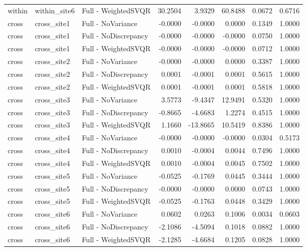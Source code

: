 \begin{table}
\begin{tabular}{lllrrrrr}
within & within\_site6 & Full - WeightedSVQR & 30.2504 & 3.9329 & 60.8488 & 0.0672 & 0.6716 \\
cross & cross\_site1 & Full - NoVariance & -0.0000 & -0.0000 & 0.0000 & 0.1349 & 1.0000 \\
cross & cross\_site1 & Full - NoDiscrepancy & -0.0000 & -0.0000 & -0.0000 & 0.0750 & 1.0000 \\
cross & cross\_site1 & Full - WeightedSVQR & -0.0000 & -0.0000 & -0.0000 & 0.0712 & 1.0000 \\
cross & cross\_site2 & Full - NoVariance & -0.0000 & -0.0000 & 0.0000 & 0.3387 & 1.0000 \\
cross & cross\_site2 & Full - NoDiscrepancy & 0.0001 & -0.0001 & 0.0001 & 0.5615 & 1.0000 \\
cross & cross\_site2 & Full - WeightedSVQR & 0.0001 & -0.0001 & 0.0001 & 0.5818 & 1.0000 \\
cross & cross\_site3 & Full - NoVariance & 3.5773 & -9.4347 & 12.9491 & 0.5320 & 1.0000 \\
cross & cross\_site3 & Full - NoDiscrepancy & -0.8665 & -4.6683 & 1.2274 & 0.4515 & 1.0000 \\
cross & cross\_site3 & Full - WeightedSVQR & 1.1660 & -13.8665 & 10.5419 & 0.8386 & 1.0000 \\
cross & cross\_site4 & Full - NoVariance & -0.0000 & -0.0000 & -0.0000 & 0.0304 & 0.5173 \\
cross & cross\_site4 & Full - NoDiscrepancy & 0.0010 & -0.0004 & 0.0044 & 0.7496 & 1.0000 \\
cross & cross\_site4 & Full - WeightedSVQR & 0.0010 & -0.0004 & 0.0045 & 0.7502 & 1.0000 \\
cross & cross\_site5 & Full - NoVariance & -0.0525 & -0.1769 & 0.0445 & 0.3444 & 1.0000 \\
cross & cross\_site5 & Full - NoDiscrepancy & -0.0000 & -0.0000 & 0.0000 & 0.0743 & 1.0000 \\
cross & cross\_site5 & Full - WeightedSVQR & -0.0525 & -0.1763 & 0.0448 & 0.3429 & 1.0000 \\
cross & cross\_site6 & Full - NoVariance & 0.0602 & 0.0263 & 0.1006 & 0.0034 & 0.0603 \\
cross & cross\_site6 & Full - NoDiscrepancy & -2.1086 & -4.5094 & 0.1018 & 0.0882 & 1.0000 \\
cross & cross\_site6 & Full - WeightedSVQR & -2.1285 & -4.6684 & 0.1205 & 0.0828 & 1.0000 \\
\bottomrule
\end{tabular}
\end{table}

